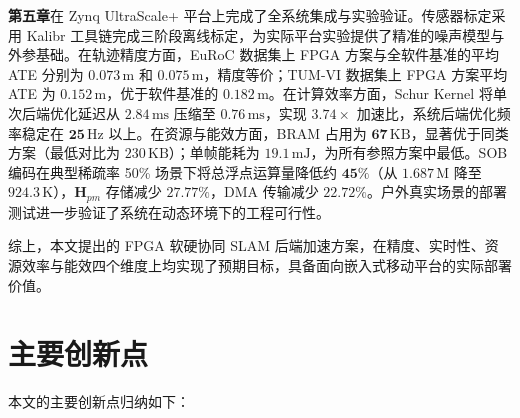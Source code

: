 \textbf{第五章}在 Zynq UltraScale+ 平台上完成了全系统集成与实验验证。传感器标定采用 Kalibr 工具链完成三阶段离线标定，为实际平台实验提供了精准的噪声模型与外参基础。在轨迹精度方面，EuRoC 数据集上 FPGA 方案与全软件基准的平均 ATE 分别为 $\mathbf{0.073\,\mathrm{m}}$ 和 $0.075\,\mathrm{m}$，精度等价；TUM-VI 数据集上 FPGA 方案平均 ATE 为 $\mathbf{0.152\,\mathrm{m}}$，优于软件基准的 $0.182\,\mathrm{m}$。在计算效率方面，Schur Kernel 将单次后端优化延迟从 $2.84\,\mathrm{ms}$ 压缩至 $\mathbf{0.76\,\mathrm{ms}}$，实现 $\mathbf{3.74\times}$ 加速比，系统后端优化频率稳定在 $\mathbf{25\,\mathrm{Hz}}$ 以上。在资源与能效方面，BRAM 占用为 $\mathbf{67\,\mathrm{KB}}$，显著优于同类方案（最低对比为 $230\,\mathrm{KB}$）；单帧能耗为 $\mathbf{19.1\,\mathrm{mJ}}$，为所有参照方案中最低。SOB 编码在典型稀疏率 50\% 场景下将总浮点运算量降低约 $\mathbf{45\%}$（从 $1.687\,\mathrm{M}$ 降至 $924.3\,\mathrm{K}$），$\mathbf{H}_{pm}$ 存储减少 $27.77\%$，DMA 传输减少 $22.72\%$。户外真实场景的部署测试进一步验证了系统在动态环境下的工程可行性。

综上，本文提出的 FPGA 软硬协同 SLAM 后端加速方案，在精度、实时性、资源效率与能效四个维度上均实现了预期目标，具备面向嵌入式移动平台的实际部署价值。

\section{主要创新点}

本文的主要创新点归纳如下：


